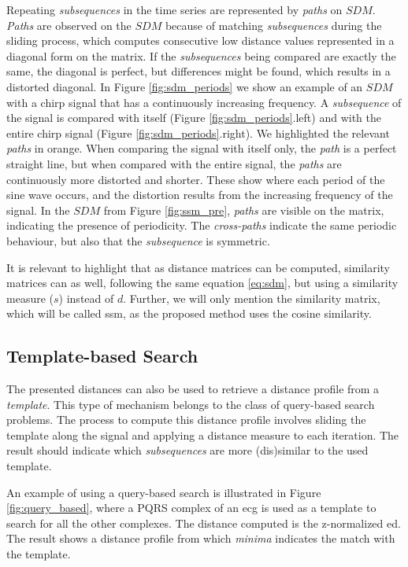 Repeating \textit{subsequences} in the time series are represented by \textit{paths} on $SDM$. \textit{Paths} are observed on the $SDM$ because of matching \textit{subsequences} during the sliding process, which computes consecutive low distance values represented in a diagonal form on the matrix. If the \textit{subsequences} being compared are exactly the same, the diagonal is perfect, but differences might be found, which results in a distorted diagonal. In Figure \ref{fig:sdm_periods} we show an example of an $SDM$ with a chirp signal that has a continuously increasing frequency. A \textit{subsequence} of the signal is compared with itself (Figure \ref{fig:sdm_periods}.left) and with the entire chirp signal (Figure \ref{fig:sdm_periods}.right). We highlighted the relevant \textit{paths} in orange. When comparing the signal with itself only, the \textit{path} is a perfect straight line, but when compared with the entire signal, the \textit{paths} are continuously more distorted and shorter. These show where each period of the sine wave occurs, and the distortion results from the increasing frequency of the signal. In the $SDM$ from Figure \ref{fig:ssm_pre}, \textit{paths} are visible on the matrix, indicating the presence of periodicity. The \textit{cross-paths} indicate the same periodic behaviour, but also that the \textit{subsequence} is symmetric.

It is relevant to highlight that as distance matrices can be computed, similarity matrices can as well, following the same equation \ref{eq:sdm}, but using a similarity measure ($s$) instead of $d$. Further, we will only mention the similarity matrix, which will be called \gls{ssm}, as the proposed method uses the cosine similarity.

\subsection{Template-based Search}
\label{subsec:query_based_search}

The presented distances can also be used to retrieve a distance profile from a \textit{template}. This type of mechanism belongs to the class of query-based search problems. The process to compute this distance profile involves sliding the template along the signal and applying a distance measure to each iteration. The result should indicate which \textit{subsequences} are more (dis)similar to the used template.
\par
An example of using a query-based search is illustrated in Figure \ref{fig:query_based}, where a PQRS complex of an \gls{ecg} is used as a template to search for all the other complexes. The distance computed is the z-normalized \gls{ed}. The result shows a distance profile from which \textit{minima} indicates the match with the template.

